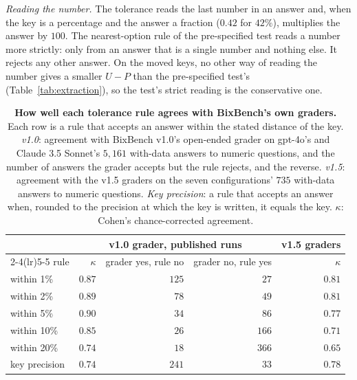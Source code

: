 \documentclass{article}
\begin{document}
\emph{Reading the number.} The tolerance reads the last number in an answer and, when the key is a percentage and
the answer a fraction ($0.42$ for $42\%$), multiplies the answer by $100$. The nearest-option rule of the
pre-specified test reads a number more strictly: only from an answer that is a single number and nothing else. It rejects any other answer. On the
moved keys, no other way of reading the number gives a smaller $U-P$ than the pre-specified test's
(Table~\ref{tab:extraction}), so the test's strict reading is the conservative one.

\begin{table}[htbp]
\centering\footnotesize\setlength{\tabcolsep}{4pt}
\caption{\textbf{How well each tolerance rule agrees with BixBench's own graders.} Each row is a rule that accepts an
answer within the stated distance of the key. \emph{v1.0}: agreement with BixBench v1.0's open-ended grader on
gpt-4o's and Claude 3.5 Sonnet's $5{,}161$ with-data answers to numeric questions, and the number of answers the
grader accepts but the rule rejects, and the reverse. \emph{v1.5}: agreement with the v1.5 graders on the seven
configurations' $735$ with-data answers to numeric questions. \emph{Key precision}: a rule that accepts an answer
when, rounded to the precision at which the key is written, it equals the key. $\kappa$: Cohen's chance-corrected
agreement.}
\label{tab:tolerance}
\begin{tabular}{lrrrr}
\toprule
& \multicolumn{3}{c}{v1.0 grader, published runs} & v1.5 graders\\
\cmidrule(lr){2-4}\cmidrule(lr){5-5}
rule & $\kappa$ & grader yes, rule no & grader no, rule yes & $\kappa$\\
\midrule
within 1\% & $0.87$ & $125$ & $27$ & $0.81$\\
within 2\% & $0.89$ & $78$ & $49$ & $0.81$\\
within 5\% & $0.90$ & $34$ & $86$ & $0.77$\\
within 10\% & $0.85$ & $26$ & $166$ & $0.71$\\
within 20\% & $0.74$ & $18$ & $366$ & $0.65$\\
key precision & $0.74$ & $241$ & $33$ & $0.78$\\
\bottomrule
\end{tabular}
\end{table}
\end{document}
